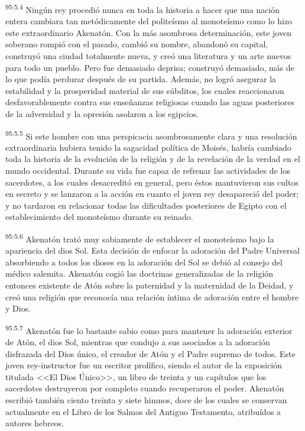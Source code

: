 \par
\textsuperscript{95:5.4} Ningún rey procedió nunca en toda la historia a hacer que una nación entera cambiara tan metódicamente del politeísmo al monoteísmo como lo hizo este extraordinario Akenatón. Con la más asombrosa determinación, este joven soberano rompió con el pasado, cambió su nombre, abandonó su capital, construyó una ciudad totalmente nueva, y creó una literatura y un arte nuevos para todo un pueblo. Pero fue demasiado deprisa; construyó demasiado, más de lo que podía perdurar después de su partida. Además, no logró asegurar la estabilidad y la prosperidad material de sus súbditos, los cuales reaccionaron desfavorablemente contra sus enseñanzas religiosas cuando las aguas posteriores de la adversidad y la opresión asolaron a los egipcios.

\par
\textsuperscript{95:5.5} Si este hombre con una perspicacia asombrosamente clara y una resolución extraordinaria hubiera tenido la sagacidad política de Moisés, habría cambiado toda la historia de la evolución de la religión y de la revelación de la verdad en el mundo occidental. Durante su vida fue capaz de refrenar las actividades de los sacerdotes, a los cuales desacreditó en general, pero éstos mantuvieron sus cultos en secreto y se lanzaron a la acción en cuanto el joven rey desapareció del poder; y no tardaron en relacionar todas las dificultades posteriores de Egipto con el establecimiento del monoteísmo durante su reinado.

\par
\textsuperscript{95:5.6} Akenatón trató muy sabiamente de establecer el monoteísmo bajo la apariencia del dios Sol. Esta decisión de enfocar la adoración del Padre Universal absorbiendo a todos los dioses en la adoración del Sol se debió al consejo del médico salemita. Akenatón cogió las doctrinas generalizadas de la religión entonces existente de Atón sobre la paternidad y la maternidad de la Deidad, y creó una religión que reconocía una relación íntima de adoración entre el hombre y Dios.

\par
\textsuperscript{95:5.7} Akenatón fue lo bastante sabio como para mantener la adoración exterior de Atón, el dios Sol, mientras que condujo a sus asociados a la adoración disfrazada del Dios único, el creador de Atón y el Padre supremo de todos. Este joven rey-instructor fue un escritor prolífico, siendo el autor de la exposición titulada <<El Dios Único>>, un libro de treinta y un capítulos que los sacerdotes destruyeron por completo cuando recuperaron el poder. Akenatón escribió también ciento treinta y siete himnos, doce de los cuales se conservan actualmente en el Libro de los Salmos del Antiguo Testamento, atribuídos a autores hebreos.

